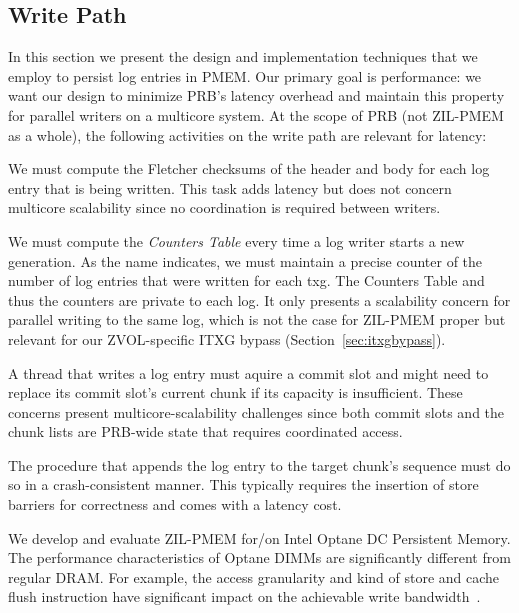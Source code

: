 \documentclass[12pt,a4paper,twoside]{book}
\begin{document}
\subsection{Write Path}\label{di:prb:write}
In this section we present the design and implementation techniques that we employ to persist log entries in PMEM.
Our primary goal is performance: we want our design to minimize PRB's latency overhead and maintain this property for parallel writers on a multicore system.
At the scope of PRB (not ZIL-PMEM as a whole), the following activities on the write path are relevant for latency:
\begin{description}[noitemsep]
    \item[Checksumming] We must compute the Fletcher checksums of the header and body for each log entry that is being written.
        This task adds latency but does not concern multicore scalability since no coordination is required between writers.
    \item[Log Structure Encoding] We must compute the \textit{Counters Table} every time a log writer starts a new generation.
        As the name indicates, we must maintain a precise counter of the number of log entries that were written for each txg.
        The Counters Table and thus the counters are private to each log.
        It only presents a scalability concern for parallel writing to the same log, which is not the case for ZIL-PMEM proper but relevant for our ZVOL-specific ITXG bypass (Section~\ref{sec:itxgbypass}).
    \item[Commit Slot Aquisition \& Chunk Replacement]
        A thread that writes a log entry must aquire a commit slot and might need to replace its commit slot's current chunk if its capacity is insufficient.
        These concerns present multicore-scalability challenges since both commit slots and the chunk lists are PRB-wide state that requires coordinated access.
    \item[Crash Consistency] The procedure that appends the log entry to the target chunk's sequence must do so in a crash-consistent manner.
        This typically requires the insertion of store barriers for correctness and comes with a latency cost.
    \item[Optane-Specific Performance Characteristics]
        We develop and evaluate ZIL-PMEM for/on Intel Optane DC Persistent Memory.
        The performance characteristics of Optane DIMMs are significantly different from regular DRAM.
        For example, the access granularity and kind of store and cache flush instruction have significant impact on the achievable write bandwidth~\cite{yangEmpiricalGuideBehavior2020}.
\end{description}
\end{document}
